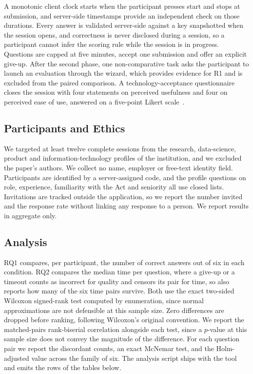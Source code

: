 \documentclass[10pt,conference]{IEEEtran}
\begin{document}
A monotonic client clock starts when the participant presses start and stops at submission, and server-side timestamps provide an independent check on those durations.
Every answer is validated server-side against a key snapshotted when the session opens, and correctness is never disclosed during a session, so a participant cannot infer the scoring rule while the session is in progress.
Questions are capped at five minutes, accept one submission and offer an explicit give-up.
After the second phase, one non-comparative task asks the participant to launch an evaluation through the wizard, which provides evidence for R1 and is excluded from the paired comparison.
A technology-acceptance questionnaire closes the session with four statements on perceived usefulness and four on perceived ease of use, answered on a five-point Likert scale~\cite{davis1989tam}.

\subsection{Participants and Ethics}
We targeted at least twelve complete sessions from the research, data-science, product and information-technology profiles of the institution, and we excluded the paper's authors.
We collect no name, employer or free-text identity field.
Participants are identified by a server-assigned code, and the profile questions on role, experience, familiarity with the Act and seniority all use closed lists.
Invitations are tracked outside the application, so we report the number invited and the response rate without linking any response to a person.
We report results in aggregate only.

\subsection{Analysis}
RQ1 compares, per participant, the number of correct answers out of six in each condition.
RQ2 compares the median time per question, where a give-up or a timeout counts as incorrect for quality and censors its pair for time, so  also reports how many of the six time pairs survive.
Both use the exact two-sided Wilcoxon signed-rank test computed by enumeration, since normal approximations are not defensible at this sample size.
Zero differences are dropped before ranking, following Wilcoxon's original convention.
We report the matched-pairs rank-biserial correlation alongside each test, since a $p$-value at this sample size does not convey the magnitude of the difference.
For each question pair we report the discordant counts, an exact McNemar test, and the Holm-adjusted value across the family of six.
The analysis script ships with the tool and emits the rows of the tables below.
\end{document}
